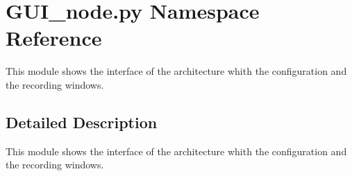 \hypertarget{namespaceGUI__node_1_1py}{}\section{G\+U\+I\+\_\+node.\+py Namespace Reference}
\label{namespaceGUI__node_1_1py}


This module shows the interface of the architecture whith the configuration and the recording windows.  




\subsection{Detailed Description}
This module shows the interface of the architecture whith the configuration and the recording windows. 